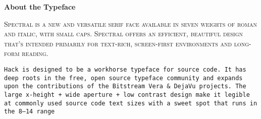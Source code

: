 \begin{center}
{\Large\textbf{About the Typeface}}

\entryskip

\begin{minipage}{0.5\textwidth}\small
\textsc{Spectral is a new and versatile serif face available in seven weights of roman and italic, with small caps.
Spectral offers an efficient, beautiful design that’s intended primarily for text-rich, screen-first environments and long-form reading.}

\entryskip

\texttt{Hack is designed to be a workhorse typeface for source code.
It has deep roots in the free, open source typeface community and expands upon the contributions of the Bitstream Vera \& DejaVu projects.
The large x-height + wide aperture + low contrast design make it legible at commonly used source code text sizes with a sweet spot that runs in the 8--14 range}
\end{minipage}
\end{center}

